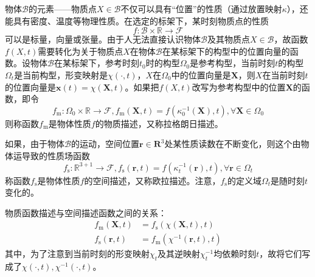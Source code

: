 \documentclass[main.tex]{subfiles}
\begin{document}
物体$\mathcal{B}$的元素——物质点$X\in\mathcal{B}$不仅可以具有“位置”的性质（通过放置映射$\kappa$），还能具有密度、温度等物理性质。在选定的标架下，某时刻物质点的性质
\[f:\mathcal{B}\times\mathbb{R}\rightarrow \mathcal{F}\]
可以是标量，向量或张量。由于人无法直接认识物体$\mathcal{B}$及其物质点$X\in\mathcal{B}$，故函数$f\left(X,t\right)$需要转化为关于物质点$X$在物体$\mathcal{B}$在某标架下的构型中的位置向量的函数。设物体$\mathcal{B}$在某标架下，参考时刻$t_0$时的构型$\Omega_0$是参考构型，当前时刻$t$的构型$\Omega_t$是当前构型，形变映射是$\chi\left(\cdot,t\right)$，$X$在$\Omega_0$中的位置向量是$\mathbf{X}$，则$X$在当前时刻$t$的位置向量是$\mathbf{x}\left(t\right)=\chi\left(\mathbf{X},t\right)$。如果把$f\left(X,t\right)$改写为参考构型中的位置$\mathbf{X}$的函数，即令
\[f_\mathrm{m}:\Omega_0\times\mathbb{R}\rightarrow\mathcal{F},f_\mathrm{m}\left(\mathbf{X},t\right)=f\left(\kappa_0^{-1}\left(\mathbf{X}\right),t\right),\forall\mathbf{X}\in\Omega_0\]
则称函数$f_\mathrm{m}$是物体性质$f$的物质描述，又称拉格朗日描述。

如果，由于物体$\mathcal{B}$的运动，空间位置$\mathbf{r}\in\mathbf{R}^3$处某性质读数在不断变化，则这个由物体运导致的性质场函数
\[f_\mathrm{s}:\mathbb{R}^{3+1}\rightarrow\mathcal{F},f_\mathrm{s}\left(\mathbf{r},t\right)=f\left(\kappa_t^{-1}\left(\mathbf{r}\right),t\right),\forall\mathbf{r}\in\Omega_t\]
称函数$f_\mathrm{s}$是物体性质$f$的空间描述，又称欧拉描述。注意，$f_\mathrm{s}$的定义域$\Omega_t$是随时刻$t$变化的。

物质函数描述与空间描述函数之间的关系：
\begin{align*}    
f_\mathrm{m}\left(\mathbf{X},t\right)&=f_\mathrm{s}\left(\chi\left(\mathbf{X},t\right),t\right)\\
f_\mathrm{s}\left(\mathbf{r},t\right)&=f_\mathrm{m}\left(\chi^{-1}\left(\mathbf{r},t\right),t\right)
\end{align*}
其中，为了注意到当前时刻的形变映射$\chi_t$及其逆映射$\chi_t^{-1}$均依赖时刻$t$，故将它们写成了$\chi\left(\cdot,t\right),\chi^{-1}\left(\cdot,t\right)$。
\end{document}
